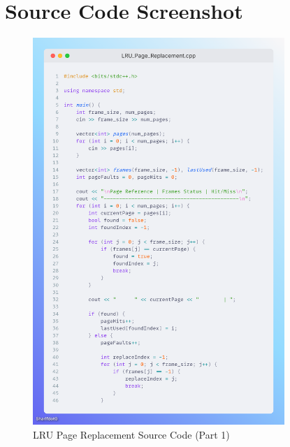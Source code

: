 \documentclass[12pt,a4paper]{article}
\begin{document}
\section{Source Code Screenshot}
\begin{figure}[H]
	\centering
	\includegraphics[width=0.85\textwidth]{Code1.png}
	\caption{LRU Page Replacement Source Code (Part 1)}
\end{figure}
\end{document}
